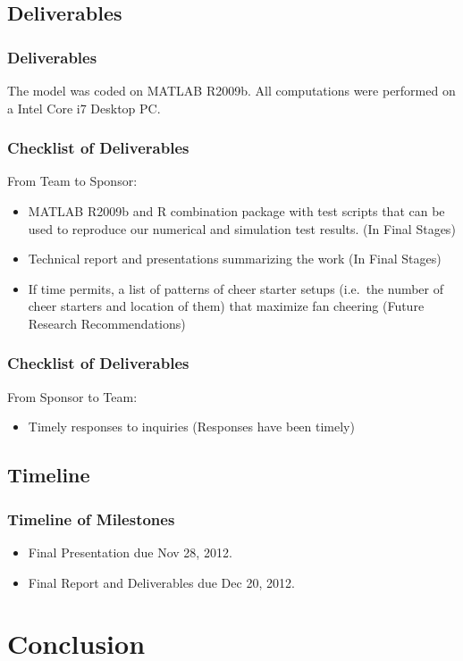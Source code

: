 \documentclass[compress,handout,10pt]{beamer}
\let\olditem\item
\renewcommand{\item}{\setlength{\itemsep}{0.5\baselineskip}\olditem}
\begin{document}
\subsection{Deliverables}

\begin{frame}
	\frametitle{Deliverables}
	The model was coded on MATLAB R2009b. All computations were performed on a Intel Core i7 Desktop PC. \newline
	\end{frame}

\begin{frame}
	\frametitle{Checklist of Deliverables}
	From Team to Sponsor:
	\begin {itemize}
	\item MATLAB R2009b and R combination package with test scripts that can be used to reproduce our numerical and simulation test results. (In Final Stages)
		\item Technical report and presentations summarizing the work (In Final Stages)
	\item If time permits, a list of patterns of cheer starter setups (i.e.~the number of cheer starters and location of them) that maximize fan cheering (Future Research Recommendations)
	\end{itemize}
\end{frame}

\begin{frame}
	\frametitle{Checklist of Deliverables}
	From Sponsor to Team:
	\begin{itemize}
		\item Timely responses to inquiries (Responses have been timely)
	\end{itemize}
\end{frame}

\subsection{Timeline}

\begin{frame}
	\frametitle{Timeline of Milestones}
	\begin{itemize}
    \item Final Presentation due Nov 28, 2012.
    \item Final Report and Deliverables due Dec 20, 2012.
	\end{itemize}
\end{frame}

\section{Conclusion}
\end{document}

